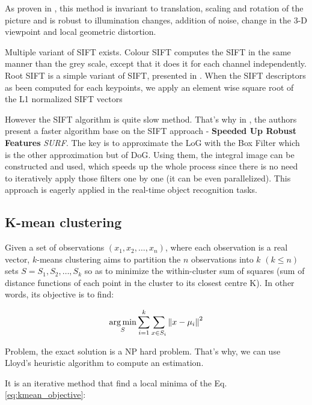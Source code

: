 As proven in \cite{Lowe2004}, this method is invariant to translation, scaling and rotation of the picture and is robust to illumination changes, addition of noise, change in the 3-D viewpoint and local geometric distortion.

Multiple variant of SIFT exists. Colour SIFT computes the SIFT in the same manner than the grey scale, except that it does it for each channel independently. Root SIFT is a simple variant of SIFT, presented in \cite{Arandjelovic2012}. When the SIFT descriptors as been computed for each keypoints, we apply an element wise square root of the L1 normalized SIFT vectors


However the SIFT algorithm is quite slow method. That's why in \cite{Bay2006}, the authors present a faster algorithm base on the SIFT approach - \textbf{Speeded Up Robust Features} \textit{SURF}. 
The key is to approximate the LoG with the Box Filter which is the other approximation but of DoG. Using them, the integral image can be constructed and used, which speeds up the whole process since there is no need to iteratively apply those filters one by one (it can be even parallelized). This approach is eagerly applied in the real-time object recognition tasks.

\subsection{K-mean clustering}

Given a set of observations $(x_1, x_2, …, x_n)$, where each observation is a real vector, $k$-means clustering aims to partition the $n$ observations into $k$ $(k \leq n)$ sets $S = {S_1, S_2, …, S_k}$ so as to minimize the within-cluster sum of squares (sum of distance functions of each point in the cluster to its closest centre K). In other words, its objective is to find:

\begin{equation} \label{eq:kmean_objective}
    \underset {S}{\operatorname {arg\,min}} \sum _{i=1}^{k} \sum _{x \in S_{i}} \left\| x - \mu_{i} \right\|^{2}
\end{equation}

Problem, the exact solution is a NP hard problem. That's why, we can use Lloyd's heuristic algorithm to compute an estimation.

It is an iterative method that find a local minima of the Eq. \ref{eq:kmean_objective}:

